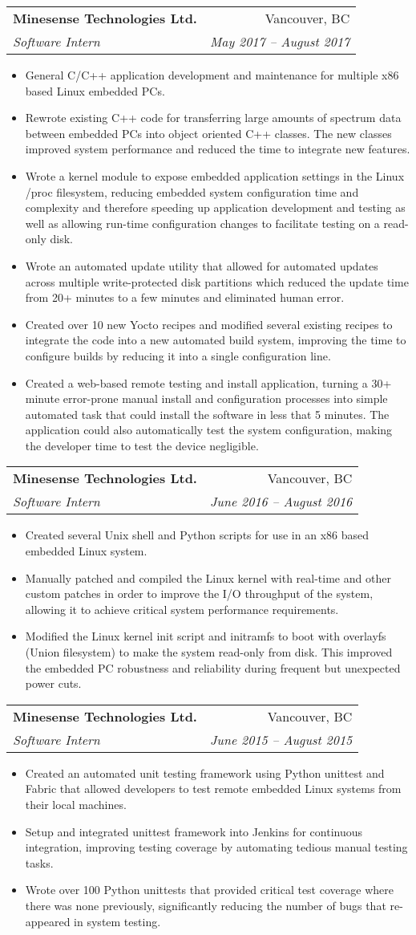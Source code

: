 \documentclass[letterpaper,11pt]{article}
\makeatletter
\newcommand{\resumeItem}[2]{
  \item\small{
    \textbf{#1}{#2 \vspace{-2pt}}
  }
}
\newcommand{\resumeSubheading}[4]{
  \vspace{-1pt}\item
    \begin{tabular*}{0.97\textwidth}[t]{l@{\extracolsep{\fill}}r}
      \textbf{#1} & #2 \\
      \textit{\small#3} & \textit{\small #4} \\
    \end{tabular*}\vspace{-5pt}
}
\newcommand{\resumeItemListStart}{\begin{itemize}}
\newcommand{\resumeItemListEnd}{\end{itemize}\vspace{-5pt}}
\makeatother
\begin{document}
    \resumeSubheading
      {Minesense Technologies Ltd.}{Vancouver, BC} 
      {Software Intern}{May 2017 -- August 2017}
      \resumeItemListStart
        \resumeItem{} {General C/C++ application development and maintenance for multiple x86 based Linux embedded PCs.}
        \resumeItem{} {Rewrote existing C++ code for transferring large amounts of spectrum data between embedded PCs into object oriented C++ classes. The new classes improved system performance and reduced the time to integrate new features.}
        \resumeItem{} {Wrote a kernel module to expose embedded application settings in the Linux /proc filesystem, reducing embedded system configuration time and complexity and therefore speeding up application development and testing as well as allowing run-time configuration changes to facilitate testing on a read-only disk.}
        \resumeItem{} {Wrote an automated update utility that allowed for automated updates across multiple write-protected disk partitions which reduced the update time from 20+ minutes to a few minutes and eliminated human error.}
        \resumeItem{} {Created over 10 new Yocto recipes and modified several existing recipes to integrate the code into a new automated build system, improving the time to configure builds by reducing it into a single configuration line.}
        \resumeItem{} {Created a web-based remote testing and install application, turning a 30+ minute error-prone manual install and configuration processes into simple automated task that could install the software in less that 5 minutes. The application could also automatically test the system configuration, making the developer time to test the device negligible.}
      \resumeItemListEnd

    \resumeSubheading
      {Minesense Technologies Ltd.}{Vancouver, BC}
      {Software Intern}{June 2016 -- August 2016}
      \resumeItemListStart
        \resumeItem{} {Created several Unix shell and Python scripts for use in an x86 based embedded Linux system.}
        \resumeItem{} {Manually patched and compiled the Linux kernel with real-time and other custom patches in order to improve the I/O throughput of the system, allowing it to achieve critical system performance requirements.}
        \resumeItem{} {Modified the Linux kernel init script and initramfs to boot with overlayfs (Union filesystem) to make the system read-only from disk. This improved the embedded PC robustness and reliability during frequent but unexpected power cuts.}
      \resumeItemListEnd

    \resumeSubheading
      {Minesense Technologies Ltd.}{Vancouver, BC}
      {Software Intern}{June 2015 -- August 2015}
      \resumeItemListStart
        \resumeItem{} {Created an automated unit testing framework using Python unittest and Fabric that allowed developers to test remote embedded Linux systems from their local machines.}
        \resumeItem{} {Setup and integrated unittest framework into Jenkins for continuous integration, improving testing coverage by automating tedious manual testing tasks.}
        \resumeItem{} {Wrote over 100 Python unittests that provided critical test coverage where there was none previously, significantly reducing the number of bugs that re-appeared in system testing.}
      \resumeItemListEnd
\end{document}
